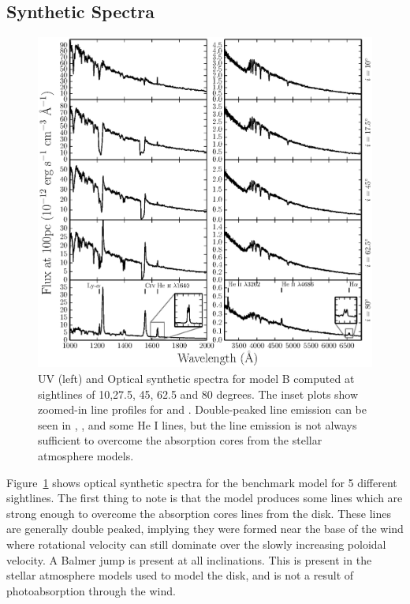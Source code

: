 \documentclass[preprint, a4paper, 11pt]{aastex}
\begin{document}
\subsection{Synthetic Spectra}

\begin{figure} %
\includegraphics[width=\textwidth]{figures/fig5_uv_opt.eps}
\caption{
UV (left) and Optical synthetic spectra for model B computed at
sightlines of 10,27.5, 45, 62.5 and 80 degrees.	
The inset plots show zoomed-in line profiles for 
\heiiuv and \ha. Double-peaked line emission can be seen in 
\heiiuv, \heiiopt, \ha and some He I lines, but the 
line emission is not always sufficient to overcome the absorption
cores from the stellar atmosphere models.
}
\label{spec}
\end{figure} %

Figure~\ref{spec} shows optical synthetic spectra for the benchmark 
model for 5 different sightlines. The first thing to note is that the 
model produces some lines which are strong enough to overcome
the absorption cores lines from the disk. These lines are generally double peaked, 
implying they were formed near the base of the wind where rotational velocity
can still dominate over the slowly increasing poloidal velocity. A Balmer 
jump is present at all inclinations. This is present
in the stellar atmosphere models used to model the disk,
and is not a result of photoabsorption through the wind.
\end{document}
